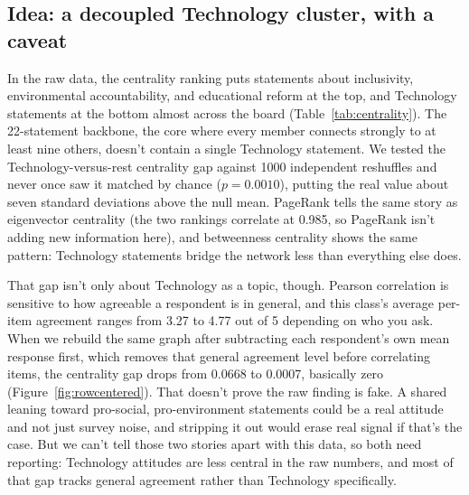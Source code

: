 \documentclass[11pt]{article}
\begin{document}
\subsection{Idea: a decoupled Technology cluster, with a caveat}

In the raw data, the centrality ranking puts statements about inclusivity, environmental
accountability, and educational reform at the top, and Technology statements at the bottom almost
across the board (Table~\ref{tab:centrality}). The 22-statement backbone, the core where every member
connects strongly to at least nine others, doesn't contain a single Technology statement. We tested
the Technology-versus-rest centrality gap against 1000 independent reshuffles and never once saw it
matched by chance ($p = 0.0010$), putting the real value about seven standard deviations above the
null mean. PageRank tells the same story as eigenvector centrality (the two rankings correlate at
0.985, so PageRank isn't adding new information here), and betweenness centrality shows the same
pattern: Technology statements bridge the network less than everything else does.

That gap isn't only about Technology as a topic, though. Pearson correlation is sensitive to how
agreeable a respondent is in general, and this class's average per-item agreement ranges from 3.27 to
4.77 out of 5 depending on who you ask. When we rebuild the same graph after subtracting each
respondent's own mean response first, which removes that general agreement level before correlating
items, the centrality gap drops from 0.0668 to 0.0007, basically zero (Figure~\ref{fig:rowcentered}).
That doesn't prove the raw finding is fake. A shared leaning toward pro-social, pro-environment
statements could be a real attitude and not just survey noise, and stripping it out would erase real
signal if that's the case. But we can't tell those two stories apart with this data, so both need
reporting: Technology attitudes are less central in the raw numbers, and most of that gap tracks
general agreement rather than Technology specifically.
\end{document}
